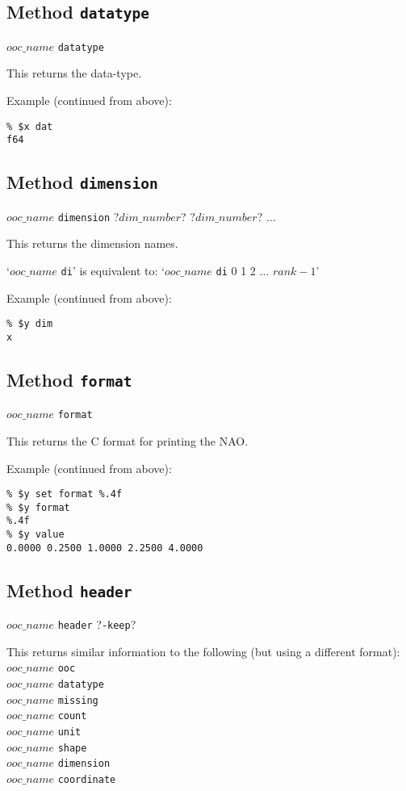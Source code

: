 \subsection{Method \texttt{datatype}}
    \label{ooc-meta-datatype}

  $ooc\_name$ \texttt{datatype}

This returns the data-type.
  
Example (continued from above):
  \begin{verbatim}
% $x dat
f64
\end{verbatim}

\subsection{Method \texttt{dimension}}
    \label{ooc-meta-dimension}

$ooc\_name$ \texttt{dimension} ?$dim\_number$? ?$dim\_number$? $\ldots$

This returns the dimension names.

  `$ooc\_name$ \texttt{di}'
  is equivalent to:
  `$ooc\_name$ \texttt{di} 0 1 2 $\ldots$ $rank-1$'

Example (continued from above):
  \begin{verbatim}
% $y dim
x
\end{verbatim}

\subsection{Method \texttt{format}}
    \label{ooc-meta-format}

  $ooc\_name$ \texttt{format}

This returns the C format for printing the NAO.
  
Example (continued from above):
  \begin{verbatim}
% $y set format %.4f
% $y format
%.4f
% $y value
0.0000 0.2500 1.0000 2.2500 4.0000
\end{verbatim}

\subsection{Method \texttt{header}}
    \label{ooc-meta-header}

$ooc\_name$ \texttt{header} ?\texttt{-keep}?

This returns similar information to the following (but using a
  different format):
  \\
  $ooc\_name$ 
  \texttt{ooc}
  \\
  $ooc\_name$ 
  \texttt{datatype}
  \\
  $ooc\_name$ 
  \texttt{missing}
  \\
  $ooc\_name$ 
  \texttt{count}
  \\
  $ooc\_name$ 
  \texttt{unit}
  \\
  $ooc\_name$ 
  \texttt{shape}
  \\
  $ooc\_name$ 
  \texttt{dimension}
  \\
  $ooc\_name$ 
  \texttt{coordinate}

